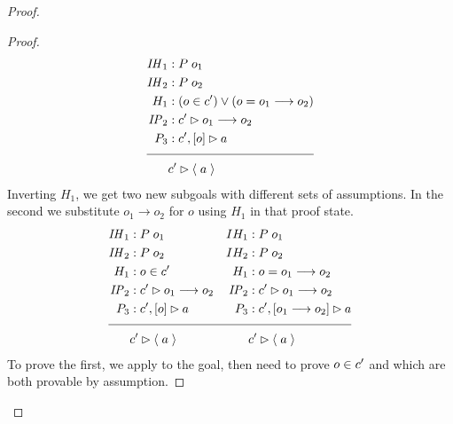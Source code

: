 \begin{proof}
\begin{proof}
\newpage

\vspace{-20pt}

\begin{align*}
\mathit{IH}_1 &: P \; o_1 \\
\mathit{IH}_2 &: P \; o_2 \\
H_1 &: (o \in \inddyncon{}) \vee (o = o_1 \longrightarrow o_2) \\
\mathit{IP}_2 &: \seqsl[\inddyncon{}]{o_1 \longrightarrow o_2} \\
P_3 &: \bchsl[\inddyncon{}]{o}{a} \\[\pfshift{}]
\cline{1-2}
& \seqsl[\inddyncon{}]{\atom{a}}
\end{align*}
Inverting $H_1$, we get two new subgoals with different sets of assumptions. In the second we substitute $o_1 \longrightarrow o_2$ for $o$ using $H_1$ in that proof state.
\begin{align*}
\mathit{IH}_1 &: P \; o_1  & IH_1 &: P \; o_1 \\
\mathit{IH}_2 &: P \; o_2  & IH_2 &: P \; o_2 \\
H_1 &: o \in \inddyncon{}  & H_1 &: o = o_1 \longrightarrow o_2 \\
\mathit{IP}_2 &: \seqsl[\inddyncon{}]{o_1 \longrightarrow o_2}  &\mathit{IP}_2 &: \seqsl[\inddyncon{}]{o_1 \longrightarrow o_2} \\
P_3 &: \bchsl[\inddyncon{}]{o}{a}  & P_3 &: \bchsl[\inddyncon{}]{o_1 \longrightarrow o_2}{a} \\[\pfshift{}]
\cline{1-4}
& \seqsl[\inddyncon{}]{\atom{a}} &&\seqsl[\inddyncon{}]{\atom{a}}
\end{align*}
To prove the first, we apply \rlnmsinit{} to the goal, then need to prove $o \in c'{}$ and  which are both provable by assumption.


\end{proof}
\end{proof}
